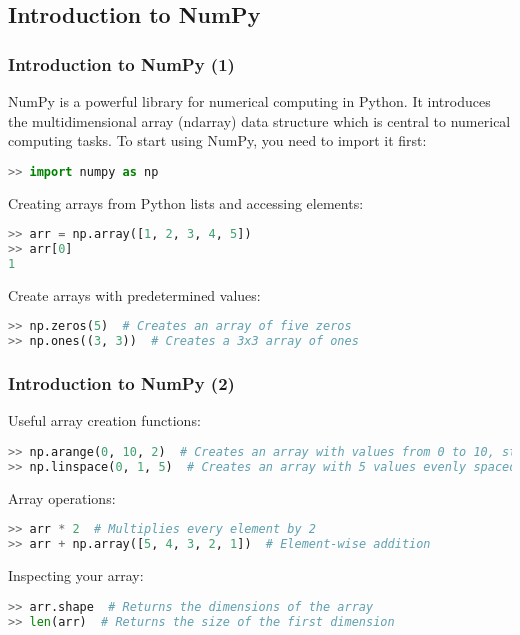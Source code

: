 \subsection*{Introduction to NumPy}
\begin{frame}[fragile]
  \frametitle{Introduction to NumPy (1)}
  NumPy is a powerful library for numerical computing in Python. It introduces the multidimensional array (ndarray) data structure which is central to numerical computing tasks. To start using NumPy, you need to import it first:
  \begin{lstlisting}[language=Python, numbers=none]
>> import numpy as np
  \end{lstlisting}\pause
  Creating arrays from Python lists and accessing elements:
  \begin{lstlisting}[language=Python, numbers=none]
>> arr = np.array([1, 2, 3, 4, 5])
>> arr[0]
1
  \end{lstlisting}\pause
  Create arrays with predetermined values:
  \begin{lstlisting}[language=Python, numbers=none]
>> np.zeros(5)  # Creates an array of five zeros
>> np.ones((3, 3))  # Creates a 3x3 array of ones
  \end{lstlisting}
\end{frame}

\begin{frame}[fragile]
  \frametitle{Introduction to NumPy (2)}
  Useful array creation functions:
  \begin{lstlisting}[language=Python, numbers=none]
>> np.arange(0, 10, 2)  # Creates an array with values from 0 to 10, step 2
>> np.linspace(0, 1, 5)  # Creates an array with 5 values evenly spaced between 0 and 1
  \end{lstlisting}\pause
  Array operations:
  \begin{lstlisting}[language=Python, numbers=none]
>> arr * 2  # Multiplies every element by 2
>> arr + np.array([5, 4, 3, 2, 1])  # Element-wise addition
  \end{lstlisting}\pause
  Inspecting your array:
  \begin{lstlisting}[language=Python, numbers=none]
>> arr.shape  # Returns the dimensions of the array
>> len(arr)  # Returns the size of the first dimension
  \end{lstlisting}
\end{frame}

